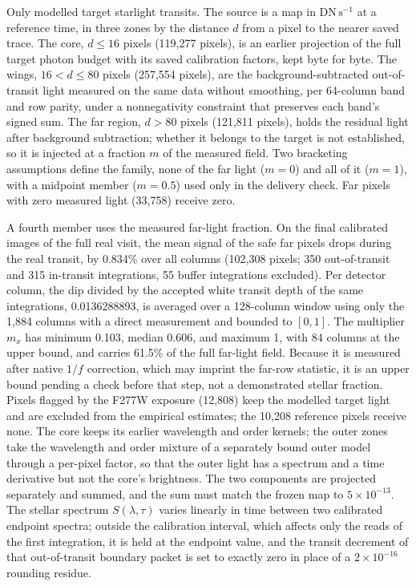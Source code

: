 Only modelled target starlight transits. The source is a map in
$\mathrm{DN\,s^{-1}}$ at a reference time, in three zones by the
distance $d$ from a pixel to the nearer saved trace. The core,
$d\leq16$ pixels (119{,}277 pixels), is an earlier projection of the full
target photon budget with its saved calibration factors, kept byte for
byte. The wings, $16<d\leq80$ pixels (257{,}554 pixels), are the
background-subtracted out-of-transit light measured on the same data
without smoothing, per 64-column band and row parity, under a
nonnegativity constraint that preserves each band's signed sum. The far
region, $d>80$ pixels (121{,}811 pixels), holds the residual light after
background subtraction; whether it belongs to the target is not
established, so it is injected at a fraction $m$ of the measured field.
Two bracketing assumptions define the family, none of the far light
($m=0$) and all of it ($m=1$), with a midpoint member ($m=0.5$) used only
in the delivery check. Far pixels with zero measured light (33{,}758)
receive zero.

A fourth member uses the measured far-light fraction. On the final
calibrated images of the full real visit, the mean signal of the safe far
pixels drops during the real transit, by 0.834\% over all columns
(102{,}308 pixels; 350 out-of-transit and 315 in-transit integrations,
55 buffer integrations excluded). Per detector column, the dip divided by the
accepted white transit depth of the same integrations, 0.0136288893, is
averaged over a 128-column window using only the 1{,}884 columns with a
direct measurement and bounded to $[0,1]$. The multiplier $m_x$ has
minimum 0.103, median 0.606, and maximum 1, with 84 columns at the upper
bound, and carries 61.5\% of the full far-light field. Because it is
measured after native $1/f$ correction, which may imprint the far-row
statistic, it is an upper bound pending a check before that step, not a
demonstrated stellar fraction. Pixels flagged by the F277W exposure
(12{,}808) keep the modelled target light and are excluded from the
empirical estimates; the 10{,}208 reference pixels receive none. The
core keeps its earlier wavelength and order kernels; the outer zones take
the wavelength and order mixture of a separately bound outer model
through a per-pixel factor, so that the outer light has a spectrum and a
time derivative but not the core's brightness. The two components are
projected separately and summed, and the sum must match the frozen map
to $5\times10^{-13}$. The stellar spectrum $S(\lambda,\tau)$
varies linearly in time between two calibrated endpoint spectra; outside
the calibration interval, which affects only the reads of the first
integration, it is held at the endpoint value, and the transit decrement
of that out-of-transit boundary packet is set to exactly zero in place
of a $2\times10^{-16}$ rounding residue.

